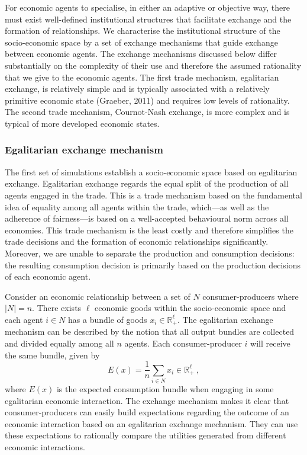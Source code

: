For economic agents to specialise, in either an adaptive or objective way, there must exist well-defined institutional structures that facilitate exchange and the formation of relationships. We characterise the institutional structure of the socio-economic space by a set of exchange mechanisms that guide exchange between economic agents. The exchange mechanisms discussed below differ substantially on the complexity of their use and therefore the assumed rationality that we give to the economic agents. The first trade mechanism, egalitarian exchange, is relatively simple and is typically associated with a relatively primitive economic state (Graeber, 2011) and requires low levels of rationality. The second trade mechanism, Cournot-Nash exchange, is more complex and is typical of more developed economic states.

\subsubsection{Egalitarian exchange mechanism}

The first set of simulations establish a socio-economic space based on egalitarian exchange. Egalitarian exchange regards the equal split of the production of all agents engaged in the trade. This is a trade mechanism based on the fundamental idea of equality among all agents within the trade, which---as well as the adherence of fairness---is based on a well-accepted behavioural norm across all economies. This trade mechanism is the least costly and therefore simplifies the trade decisions and the formation of economic relationships significantly. Moreover, we are unable to separate the production and consumption decisions: the resulting consumption decision is primarily based on the production decisions of each economic agent.

Consider an economic relationship between a set of $N$ consumer-producers where $|N| = n$. There exists $\ell$ economic goods within the socio-economic space and each agent $i \in N$ has a bundle of goods $x_i \in \mathbb{R}^{\ell}_{+}$. The egalitarian exchange mechanism can be described by the notion that all output bundles are collected and divided equally among all $n$ agents. Each consumer-producer $i$ will receive the same bundle, given by
\begin{equation}
E(x) = \frac{1}{n} \sum_{i \in N} x_i \in \mathbb{R}^{\ell}_{+}~,
\end{equation}
where $E(x)$ is the expected consumption bundle when engaging in some egalitarian economic interaction. The exchange mechanism makes it clear that consumer-producers can easily build expectations regarding the outcome of an economic interaction based on an egalitarian exchange mechanism. They can use these expectations to rationally compare the utilities generated from different economic interactions.


